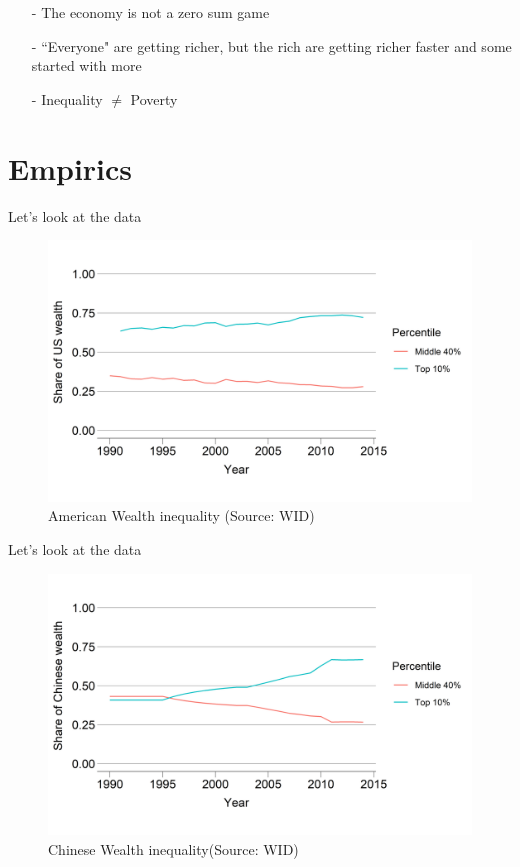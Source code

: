 \documentclass{beamer}
\begin{document}
\begin{frame}{}
\begin{itemize}
    \item[-]The economy is not a zero sum game \pause
    \item[-]``Everyone" are getting richer, but the rich are getting richer faster and some started with more\pause
    \item[-]Inequality $\neq$ Poverty
\end{itemize}{}
\end{frame}{}

\section{Empirics}

\begin{frame}{Let's look at the data} 
\begin{figure}
    \centering
    \includegraphics[width=\textwidth]{../img/InequalityUS.png}
    \caption{American Wealth inequality (Source: WID)}
\end{figure}
\end{frame}{}

\begin{frame}{Let's look at the data} 
\begin{figure}
    \centering
    \includegraphics[width=\textwidth]{../img/InequalityCN.png}
    \caption{Chinese Wealth inequality(Source: WID)}
\end{figure}
\end{frame}{}
\end{document}
